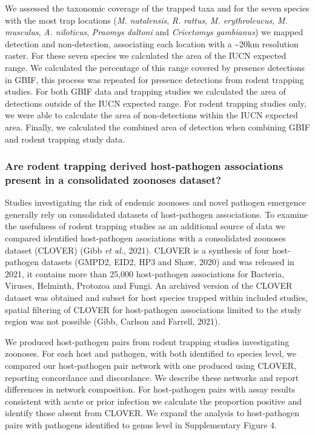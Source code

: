 \documentclass[
]{article}
\begin{document}
We assessed the taxonomic coverage of the trapped taxa and for the seven
species with the most trap locations (\emph{M. natalensis}, \emph{R.
rattus}, \emph{M. erythroleucus}, \emph{M. musculus}, \emph{A.
niloticus}, \emph{Praomys daltoni} and \emph{Cricetomys gambianus}) we
mapped detection and non-detection, associating each location with a
\textasciitilde20km resolution raster. For these seven species we
calculated the area of the IUCN expected range. We calculated the
percentage of this range covered by presence detections in GBIF, this
process was repeated for presence detections from rodent trapping
studies. For both GBIF data and trapping studies we calculated the area
of detections outside of the IUCN expected range. For rodent trapping
studies only, we were able to calculate the area of non-detections
within the IUCN expected area. Finally, we calculated the combined area
of detection when combining GBIF and rodent trapping study data.

\hypertarget{are-rodent-trapping-derived-host-pathogen-associations-present-in-a-consolidated-zoonoses-dataset}{%
\subsubsection{Are rodent trapping derived host-pathogen associations
present in a consolidated zoonoses
dataset?}\label{are-rodent-trapping-derived-host-pathogen-associations-present-in-a-consolidated-zoonoses-dataset}}

Studies investigating the risk of endemic zoonoses and novel pathogen
emergence generally rely on consolidated datasets of host-pathogen
associations. To examine the usefulness of rodent trapping studies as an
additional source of data we compared identified host-pathogen
asociations with a consolidated zoonoses dataset (CLOVER) (Gibb \emph{et
al.}, 2021). CLOVER is a synthesis of four host-pathogen datasets
(GMPD2, EID2, HP3 and Shaw, 2020) and was released in 2021, it contains
more than 25,000 host-pathogen associations for Bacteria, Viruses,
Helminth, Protozoa and Fungi. An archived version of the CLOVER dataset
was obtained and subset for host species trapped within included
studies, spatial filtering of CLOVER for host-pathogen associations
limited to the study region was not possible (Gibb, Carlson and Farrell,
2021).

We produced host-pathogen pairs from rodent trapping studies
investigating zoonoses. For each host and pathogen, with both identified
to species level, we compared our host-pathogen pair network with one
produced using CLOVER, reporting concordance and discordance. We
describe these networks and report differences in network composition.
For host-pathogen pairs with assay results consistent with acute or
prior infection we calculate the proportion positive and identify those
absent from CLOVER. We expand the analysis to host-pathogen pairs with
pathogens identified to genus level in Supplementary Figure 4.
\end{document}
